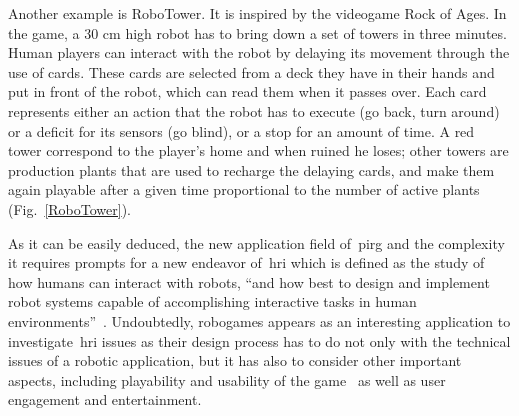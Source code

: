 
Another example is RoboTower. It is inspired by the videogame Rock of Ages. In the game, a 30 cm high robot has to bring down a set of towers in three minutes. Human players can interact with the robot by delaying its movement through the use of cards. These cards are selected from a deck they have in their hands and put in front of the robot, which can read them when it passes over. Each card represents either an action that the robot has to execute (go back, turn around) or a deficit for its sensors (go blind), or a stop for an amount of time. A red tower correspond to the player's home and when ruined he loses; other towers are production plants that are used to recharge the delaying cards, and make them again playable after a given time proportional to the number of active plants (Fig.~\ref{RoboTower}).




As it can be easily deduced, the new application field of~\gls{pirg} and the complexity it requires prompts for a new endeavor of~\gls{hri} which is defined as the study of how humans can interact with robots, ``and how best to design and implement robot systems capable of accomplishing interactive tasks in human environments''~\citep{feil-seifer_human_2009}. Undoubtedly, robogames appears as an interesting application to investigate~\gls{hri} issues as their design process has to do not only with the technical issues of a robotic application, but it has also to consider other important aspects, including playability and usability of the game~\citep{martinoia_physically_2013} as well as user engagement and entertainment.

